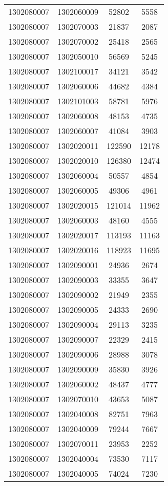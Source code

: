 \begin{longtable}{llcc}
1302080007 & 1302060009 & 52802 & 5558\\
1302080007 & 1302070003 & 21837 & 2087\\
1302080007 & 1302070002 & 25418 & 2565\\
1302080007 & 1302050010 & 56569 & 5245\\
1302080007 & 1302100017 & 34121 & 3542\\
1302080007 & 1302060006 & 44682 & 4384\\
1302080007 & 1302101003 & 58781 & 5976\\
1302080007 & 1302060008 & 48153 & 4735\\
1302080007 & 1302060007 & 41084 & 3903\\
1302080007 & 1302020011 & 122590 & 12178\\
1302080007 & 1302020010 & 126380 & 12474\\
1302080007 & 1302060004 & 50557 & 4854\\
1302080007 & 1302060005 & 49306 & 4961\\
1302080007 & 1302020015 & 121014 & 11962\\
1302080007 & 1302060003 & 48160 & 4555\\
1302080007 & 1302020017 & 113193 & 11163\\
1302080007 & 1302020016 & 118923 & 11695\\
1302080007 & 1302090001 & 24936 & 2674\\
1302080007 & 1302090003 & 33355 & 3647\\
1302080007 & 1302090002 & 21949 & 2355\\
1302080007 & 1302090005 & 24333 & 2690\\
1302080007 & 1302090004 & 29113 & 3235\\
1302080007 & 1302090007 & 22329 & 2415\\
1302080007 & 1302090006 & 28988 & 3078\\
1302080007 & 1302090009 & 35830 & 3926\\
1302080007 & 1302060002 & 48437 & 4777\\
1302080007 & 1302070010 & 43653 & 5087\\
1302080007 & 1302040008 & 82751 & 7963\\
1302080007 & 1302040009 & 79244 & 7667\\
1302080007 & 1302070011 & 23953 & 2252\\
1302080007 & 1302040004 & 73530 & 7117\\
1302080007 & 1302040005 & 74024 & 7230\\

\end{longtable}
